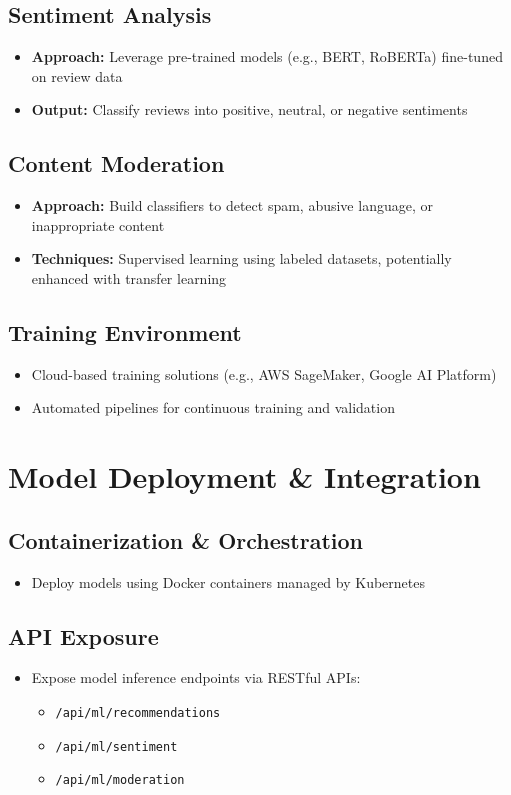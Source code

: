 \documentclass[11pt]{article}
\begin{document}
\subsection*{Sentiment Analysis}
\begin{itemize}[noitemsep]
    \item \textbf{Approach:} Leverage pre-trained models (e.g., BERT, RoBERTa) fine-tuned on review data
    \item \textbf{Output:} Classify reviews into positive, neutral, or negative sentiments
\end{itemize}

\subsection*{Content Moderation}
\begin{itemize}[noitemsep]
    \item \textbf{Approach:} Build classifiers to detect spam, abusive language, or inappropriate content
    \item \textbf{Techniques:} Supervised learning using labeled datasets, potentially enhanced with transfer learning
\end{itemize}

\subsection*{Training Environment}
\begin{itemize}[noitemsep]
    \item Cloud-based training solutions (e.g., AWS SageMaker, Google AI Platform)
    \item Automated pipelines for continuous training and validation
\end{itemize}

\section{Model Deployment \& Integration}
\subsection*{Containerization \& Orchestration}
\begin{itemize}[noitemsep]
    \item Deploy models using Docker containers managed by Kubernetes
\end{itemize}

\subsection*{API Exposure}
\begin{itemize}[noitemsep]
    \item Expose model inference endpoints via RESTful APIs:
    \begin{itemize}[noitemsep]
        \item \texttt{/api/ml/recommendations}
        \item \texttt{/api/ml/sentiment}
        \item \texttt{/api/ml/moderation}
    \end{itemize}
\end{itemize}
\end{document}
